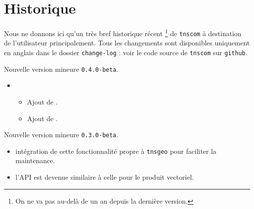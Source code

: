 \documentclass[12pt,a4paper]{article}
\begin{document}
\newpage

\section{Historique}

Nous ne donnons ici qu'un très bref historique récent
\footnote{
	On ne va pas au-delà de un an depuis la dernière version.
}
de \verb+tnscom+ à destination de l'utilisateur principalement.
Tous les changements sont disponibles uniquement en anglais dans le dossier \verb+change-log+ : voir le code source de \verb+tnscom+ sur \verb+github+.

\begin{description}

    \medskip
    \item[2020-08-05] Nouvelle version mineure \verb+0.4.0-beta+.
    
    \begin{itemize}[itemsep=.5em]
        \item {}
        \begin{itemize}[itemsep=.5em]
            \item Ajout de .
    
            \item Ajout de .
        \end{itemize}
    \end{itemize}
    
    \separation


    \medskip
    \item[2020-07-30] Nouvelle version mineure \verb+0.3.0-beta+.
    
    \begin{itemize}[itemsep=.5em]
        \item {} intégration de cette fonctionnalité propre à \verb#tnsgeo#  pour faciliter la maintenance.
    
    
        \item {} l'API est devenue similaire à celle pour le produit vectoriel.
    \end{itemize}
    
    \separation



\end{description}
\end{document}
